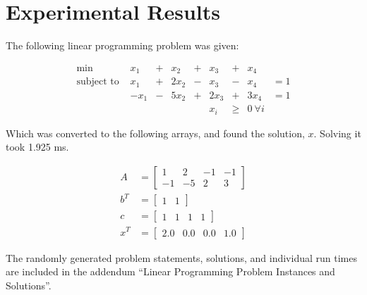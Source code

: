 \documentclass[11pt, a4paper]{article}
\begin{document}
\section{Experimental Results}


The following linear programming problem was given:

\begin{equation}
    \begin{array}{lcccccccc}
        \text{min }        & x_1  &+& x_2   &+& x_3  &+& x_4 &\\
    \text{subject to } & x_1  & +& 2x_2  &-&  x_3  &-& x_4 & = 1\\
                      & -x_1 & -& 5x_2  &+& 2x_3 &+& 3x_4 & = 1\\
                      &  && && x_i &\geq & 0\  \forall i       &
\end{array}
\end{equation}



Which was converted to the following arrays, and found the solution, $x$. Solving it took 1.925 ms.

\begin{align}
    A &=
    \begin{bmatrix}
        1  &  2  & -1  & -1 \\
        -1  & -5  &  2  &  3 
    \end{bmatrix}\\
    b^T &=
    \begin{bmatrix}
        1  &  1 
    \end{bmatrix}\\
    c &=
    \begin{bmatrix}
        1  &  1  &  1  &  1 
    \end{bmatrix}\\
    x^T &=
    \begin{bmatrix}
        2.0 &  0.0 &  0.0 &  1.0
    \end{bmatrix}
\end{align}


The randomly generated problem statements, solutions, and individual run times are included in the
addendum ``Linear Programming Problem Instances and Solutions''.
\end{document}
